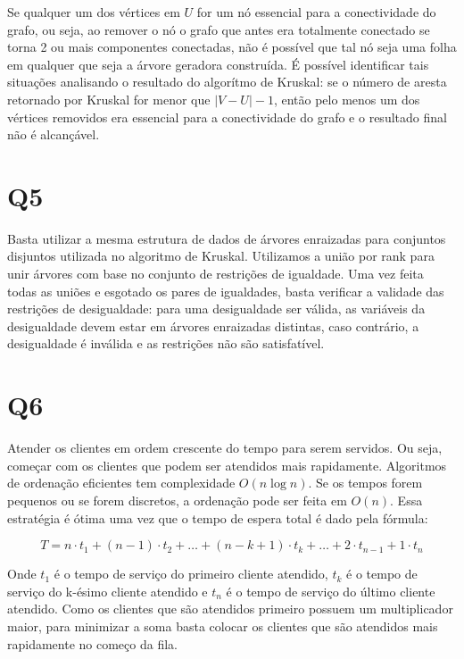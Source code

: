 \documentclass[12pt, a4paper]{article}
\begin{document}
Se qualquer um dos vértices em $U$ for um nó essencial para a conectividade do grafo, ou seja, ao remover o nó o grafo que antes era totalmente conectado se torna 2 ou mais componentes conectadas, não é possível que tal nó seja uma folha em qualquer que seja a árvore geradora construída. É possível identificar tais situações analisando o resultado do algorítmo de Kruskal: se o número de aresta retornado por Kruskal for menor que $\lvert V - U \rvert - 1$, então pelo menos um dos vértices removidos era essencial para a conectividade do grafo e o resultado final não é alcançável.


\section*{Q5}

Basta utilizar a mesma estrutura de dados de árvores enraizadas para conjuntos disjuntos utilizada no algoritmo de Kruskal. Utilizamos a união por rank para unir árvores com base no conjunto de restrições de igualdade. Uma vez feita todas as uniões e esgotado os pares de igualdades, basta verificar a validade das restrições de desigualdade: para uma desigualdade ser válida, as variáveis da desigualdade devem estar em árvores enraizadas distintas, caso contrário, a desigualdade é inválida e as restrições não são satisfatível.


\section*{Q6}

Atender os clientes em ordem crescente do tempo para serem servidos. Ou seja, começar com os clientes que podem ser atendidos mais rapidamente. Algoritmos de ordenação eficientes tem complexidade $O(n\log{n})$. Se os tempos forem pequenos ou se forem discretos, a ordenação pode ser feita em $O(n)$. Essa estratégia é ótima uma vez que o tempo de espera total é dado pela fórmula:

\[ T = n \cdot t_1 + (n-1) \cdot t_2 + \ldots + (n-k+1) \cdot t_k + \ldots + 2 \cdot t_{n-1} + 1 \cdot t_n \]

Onde $t_1$ é o tempo de serviço do primeiro cliente atendido, $t_k$ é o tempo de serviço do k-ésimo cliente atendido e $t_n$ é o tempo de serviço do último cliente atendido. Como os clientes que são atendidos primeiro possuem um multiplicador maior, para minimizar a soma basta colocar os clientes que são atendidos mais rapidamente no começo da fila.
\end{document}
